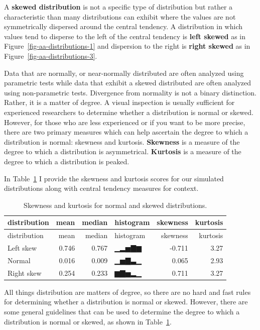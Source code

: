 \documentclass[
  letterpaper,
  DIV=11,
  numbers=noendperiod]{scrreport}
\theoremstyle{definition}
\theoremstyle{remark}
\begin{document}
A \textbf{skewed distribution} is not a specific type of distribution
but rather a characteristic than many distributions can exhibit where
the values are not symmetrically dispersed around the central tendency.
A distribution in which values tend to disperse to the left of the
central tendency is \textbf{left skewed} as in
Figure~\ref{fig-aa-distributions-1} and dispersion to the right is
\textbf{right skewed} as in Figure~\ref{fig-aa-distributions-3}.

Data that are normally, or near-normally distributed are often analyzed
using parametric tests while data that exhibit a skewed distributed are
often analyzed using non-parametric tests. Divergence from normality is
not a binary distinction. Rather, it is a matter of degree. A visual
inspection is usually sufficient for experienced researchers to
determine whether a distribution is normal or skewed. However, for those
who are less experienced or if you want to be more precise, there are
two primary measures which can help ascertain the degree to which a
distribution is normal: skewness and kurtosis. \textbf{Skewness} is a
measure of the degree to which a distribution is asymmetrical.
\textbf{Kurtosis} is a measure of the degree to which a distribution is
peaked.

In Table~\ref{tbl-aa-skewness-kurtosis} I provide the skewness and
kurtosis scores for our simulated distributions along with central
tendency measures for context.

\hypertarget{tbl-aa-skewness-kurtosis}{}
\begin{longtable}[]{@{}lrrlrr@{}}
\caption{\label{tbl-aa-skewness-kurtosis}Skewness and kurtosis for
normal and skewed distributions.}\tabularnewline
\toprule\noalign{}
distribution & mean & median & histogram & skewness & kurtosis \\
\midrule\noalign{}
\endfirsthead
\toprule\noalign{}
distribution & mean & median & histogram & skewness & kurtosis \\
\midrule\noalign{}
\endhead
\bottomrule\noalign{}
\endlastfoot
Left skew & 0.746 & 0.767 & ▁▂▅▇▆ & -0.711 & 3.27 \\
Normal & 0.016 & 0.009 & ▁▅▇▃▁ & 0.065 & 2.93 \\
Right skew & 0.254 & 0.233 & ▆▇▅▂▁ & 0.711 & 3.27 \\
\end{longtable}

All things distribution are matters of degree, so there are no hard and
fast rules for determining whether a distribution is normal or skewed.
However, there are some general guidelines that can be used to determine
the degree to which a distribution is normal or skewed, as shown in
Table~\ref{tbl-aa-skewness-kurtosis}.
\end{document}
